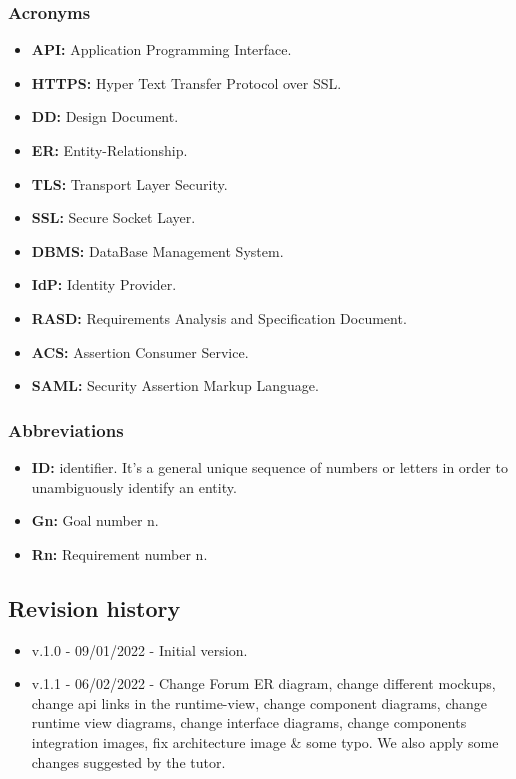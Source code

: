 \subsubsection{Acronyms}
\begin{itemize}
    \item \textbf{API:} Application Programming Interface.
    \item \textbf{HTTPS:} Hyper Text Transfer Protocol over SSL.
    \item \textbf{DD:} Design Document.
    \item \textbf{ER:} Entity-Relationship.
    \item \textbf{TLS:} Transport Layer Security.
    \item \textbf{SSL:} Secure Socket Layer.
    \item \textbf{DBMS:} DataBase Management System.
    \item \textbf{IdP:} Identity Provider.
    \item \textbf{RASD:} Requirements Analysis and Specification Document.
    \item \textbf{ACS:} Assertion Consumer Service.
     \item \textbf{SAML:} Security Assertion Markup Language.
\end{itemize}

\subsubsection{Abbreviations}
\begin{itemize}
    \item \textbf{ID:} identifier. It's a general unique sequence of numbers or letters in order to unambiguously identify an entity.
    \item \textbf{Gn:} Goal number n.
    \item \textbf{Rn:} Requirement number n.
\end{itemize}

\subsection{Revision history}
\begin{itemize}
    \item v.1.0 - 09/01/2022 - Initial version.
    \item v.1.1 - 06/02/2022 - Change Forum ER diagram, change different mockups, change api links in the runtime-view, change component diagrams, change runtime view diagrams, change interface diagrams, change components integration images, fix architecture image \& some typo. We also apply some changes suggested by the tutor.
\end{itemize}
